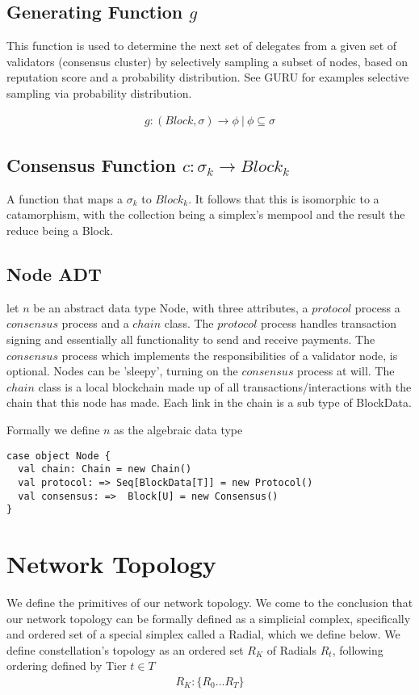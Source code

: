 \documentclass{article}
\begin{document}
\subsection{Generating Function $g$}
This function is used to determine the next set of delegates from a given set of validators (consensus cluster) by selectively sampling a subset of nodes, based on reputation score and a probability distribution. See GURU for examples selective sampling via probability distribution.

\begin{equation} \label{eq1}
\begin{split}
g: (Block, \sigma) \rightarrow \phi \ | \ \phi \subseteq \sigma
\end{split}
\end{equation}


\subsection{Consensus Function $c: \sigma_k \rightarrow  Block_k$}
A function that maps a $\sigma_k$ to $Block_k$. It follows that this is isomorphic to a catamorphism, with the collection being a simplex's mempool and the result the reduce being a Block.

\subsection{Node ADT}
let $n$ be an abstract data type Node, with three attributes, a $protocol$ process a $consensus$ process and a $chain$ class. The $protocol$ process handles transaction signing and essentially all functionality to send and receive payments. The $consensus$ process which implements the responsibilities of a validator node, is optional. Nodes can be 'sleepy', turning on the $consensus$ process at will. The $chain$ class is a local blockchain made up of all transactions/interactions with the chain that this node has made. Each link in the chain is a sub type of BlockData.

Formally we define $n$ as the algebraic data type

\begin{lstlisting}
case object Node {
  val chain: Chain = new Chain()
  val protocol: => Seq[BlockData[T]] = new Protocol()
  val consensus: =>  Block[U] = new Consensus()
}
\end{lstlisting}

\section{Network Topology}
We define the primitives of our network topology. We come to the conclusion that our network topology can be formally defined as a simplicial complex, specifically and ordered set of a special simplex called a Radial, which we define below. We define constellation's topology as an ordered set $R_K$ of Radials $R_t$, following ordering defined by Tier $t \in T$
\begin{equation} \label{eq1}
\begin{split}
R_K: \{R_0 \dots R_T \}
\end{split}
\end{equation}
\end{document}
